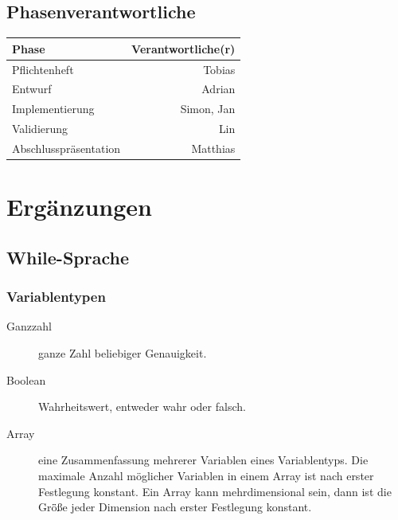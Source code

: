 \documentclass[a4paper,10pt]{article}
\begin{document}
\subsection{Phasenverantwortliche}
\begin{tabular}[h]{| l | r |}
\hline
\textbf{Phase} & \textbf{Verantwortliche(r)}\\
\hline
Pflichtenheft & Tobias\\
\hline
Entwurf & Adrian\\
\hline
Implementierung & Simon, Jan\\
\hline
Validierung & Lin\\
\hline
Abschlusspr\"{a}sentation & Matthias\\
\hline
\end{tabular}

\section{Erg\"{a}nzungen}
\subsection{While-Sprache}
\subsubsection{Variablentypen}
\begin{description}
\item[Ganzzahl] ganze Zahl beliebiger Genauigkeit.
\item[Boolean] Wahrheitswert, entweder wahr oder falsch.
\item[Array] eine Zusammenfassung mehrerer Variablen eines Variablentyps. Die maximale Anzahl m\"{o}glicher Variablen in einem Array ist nach erster Festlegung konstant. Ein Array kann mehrdimensional sein, dann ist die Gr\"{\"{o}}\ss{}e jeder Dimension nach erster Festlegung konstant.
\end{description}
\end{document}
